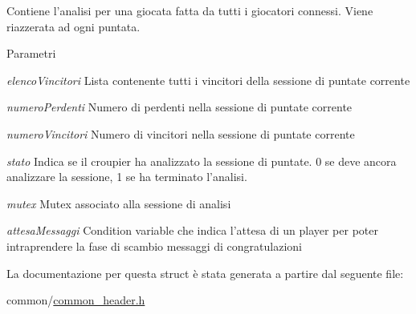 Contiene l'analisi per una giocata fatta da tutti i giocatori connessi. Viene riazzerata ad ogni puntata.


\begin{DoxyParams}{Parametri}
\item[{\em elencoVincitori}]Lista contenente tutti i vincitori della sessione di puntate corrente \item[{\em numeroPerdenti}]Numero di perdenti nella sessione di puntate corrente \item[{\em numeroVincitori}]Numero di vincitori nella sessione di puntate corrente \item[{\em stato}]Indica se il croupier ha analizzato la sessione di puntate. 0 se deve ancora analizzare la sessione, 1 se ha terminato l'analisi. \item[{\em mutex}]Mutex associato alla sessione di analisi \item[{\em attesaMessaggi}]Condition variable che indica l'attesa di un player per poter intraprendere la fase di scambio messaggi di congratulazioni \end{DoxyParams}


La documentazione per questa struct è stata generata a partire dal seguente file:\begin{DoxyCompactItemize}
\item 
common/\hyperlink{common__header_8h}{common\_\-header.h}\end{DoxyCompactItemize}
